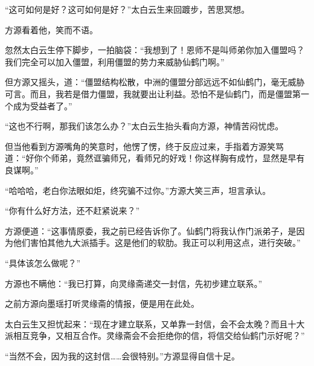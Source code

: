 \begin{this_body}
“这可如何是好？这可如何是好？”太白云生来回踱步，苦思冥想。

方源看着他，笑而不语。

忽然太白云生停下脚步，一拍脑袋：“我想到了！恩师不是叫师弟你加入僵盟吗？我们完全可以加入僵盟，利用僵盟的势力来威胁仙鹤门啊。”

但方源又摇头，道：“僵盟结构松散，中洲的僵盟分部远远不如仙鹤门，毫无威胁可言。而且，我若是借力僵盟，我就要出让利益。恐怕不是仙鹤门，而是僵盟第一个成为受益者了。”

“这也不行啊，那我们该怎么办？”太白云生抬头看向方源，神情苦闷忧虑。

但当他看到方源嘴角的笑意时，他愣了愣，终于反应过来，手指着方源笑骂道：“好你个师弟，竟然诓骗师兄，看师兄的好戏！你这样胸有成竹，显然是早有良谋啊。”

“哈哈哈，老白你法眼如炬，终究骗不过你。”方源大笑三声，坦言承认。

“你有什么好方法，还不赶紧说来？”

方源便道：“这事情原委，我之前已经告诉你了。仙鹤门将我认作门派弟子，是因为他们害怕其他九大派插手。这是他们的软肋。我正可以利用这点，进行突破。”

“具体该怎么做呢？”

方源也不瞒他：“我已打算，向灵缘斋递交一封信，先初步建立联系。”

之前方源向墨瑶打听灵缘斋的情报，便是用在此处。

太白云生又担忧起来：“现在才建立联系，又单靠一封信，会不会太晚？而且十大派相互竞争，又相互合作。灵缘斋会不会拒绝你的信，将信交给仙鹤门示好呢？”

“当然不会，因为我的这封信……会很特别。”方源显得自信十足。

\end{this_body}

